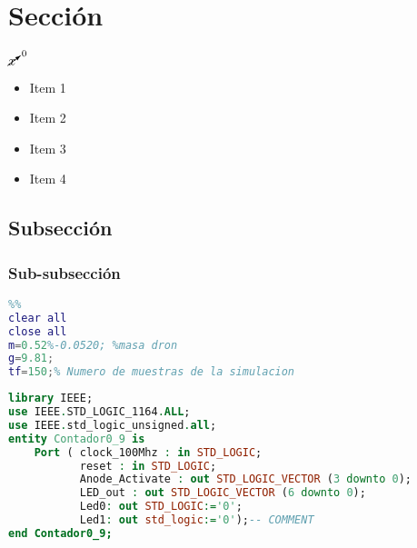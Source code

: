 \documentclass[12pt]{article}  %
\begin{document}
\thispagestyle{empty} %
\tableofcontents %
\newpage %
\setcounter{page}{1} %
\section{Sección}
\cite{gh1562} %

$\cancelto{0}{x}$ %
\begin{itemize}
    \item Item 1
    \item Item 2
    \item Item 3
    \item Item 4
\end{itemize}

\subsection{Subsección}
\cite{Agarwal2019}
\subsubsection{Sub-subsección}

\begin{lstlisting}[language=Matlab, caption=Código de matlab]
  %init_quad_reconfig_add.m %Ejecutar el programa de inicializacion
%%
clear all
close all
m=0.52%-0.0520; %masa dron
g=9.81;
tf=150;% Numero de muestras de la simulacion

\end{lstlisting}




\begin{lstlisting}[language=VHDL, caption=Código en VHDL]
  library IEEE;
use IEEE.STD_LOGIC_1164.ALL;
use IEEE.std_logic_unsigned.all;
entity Contador0_9 is
    Port ( clock_100Mhz : in STD_LOGIC;
           reset : in STD_LOGIC;
           Anode_Activate : out STD_LOGIC_VECTOR (3 downto 0);
           LED_out : out STD_LOGIC_VECTOR (6 downto 0);
           Led0: out STD_LOGIC:='0';
           Led1: out std_logic:='0');-- COMMENT
end Contador0_9;
\end{lstlisting}
\end{document}
